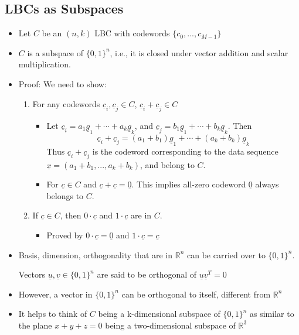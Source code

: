 \documentclass[12pt]{article}
\begin{document}
\subsection{LBCs as Subspaces}
\begin{itemize}
    \item Let $C$ be an $(n,k)$ LBC with codewords $\{c_0,...,c_{M-1} \}$
    \item $C$ is a subspace of $\{0,1\}^n$, i.e., it is closed under vector addition and scalar multiplication.
    \item Proof: We need to show:
    \begin{enumerate}[label=\arabic*)]
        \item For any codewords $\underline{c}_i, \underline{c}_j \in C$, $\underline{c}_i + \underline{c}_j \in C$
        \begin{itemize}
            \item Let $\underline{c}_i = a_1\underline{g}_1+\cdots+a_k\underline{g}_k$, and $\underline{c}_j=b_1\underline{g}_1+\cdots+b_k\underline{g}_k$. Then 
            \[
            \underline{c}_i+\underline{c}_j = (a_1+b_1)\underline{g}_1+\cdots+(a_k+b_k)\underline{g}_k
            \]
            Thus $\underline{c}_i+\underline{c}_j $ is the codeword corresponding to the data sequence $\underline{x}=(a_1+b_1,...,a_k+b_k)$, and belong to $C$.
            \item For $\underline{c}\in C$ and $\underline{c} + \underline{c} = \underline{0}$. This implies all-zero codeword $\underline{0}$ always belongs to $C$.
        \end{itemize}
        \item If $\underline{c} \in C$, then $0 \cdot \underline{c}$ and $1 \cdot \underline{c}$ are in $C$.
        \begin{itemize}
            \item Proved by $0\cdot\underline{c}=\underline{0}$ and $1\cdot\underline{c}=\underline{c}$
        \end{itemize}
    \end{enumerate}
    \item Basis, dimension, orthogonality that are in $\mathbb{R}^n$ can be carried over to $\{0,1\}^n$.
    \begin{center}
        Vectors $\underline{u},\underline{v}\in \{0,1\}^n$ are said to be orthogonal of $\underline{u}\underline{v}^T=0$
    \end{center}
    \item However, a vector in $\{0,1\}^n$ can be orthogonal to itself, different from $\mathbb{R}^n$
    \item It helps to think of $C$ being a k-dimensional subspace of $\{0,1\}^n$ as similar to the plane $x+y+z=0$ being a two-dimensional subspace of $\mathbb{R}^3$
\end{itemize}
\end{document}
